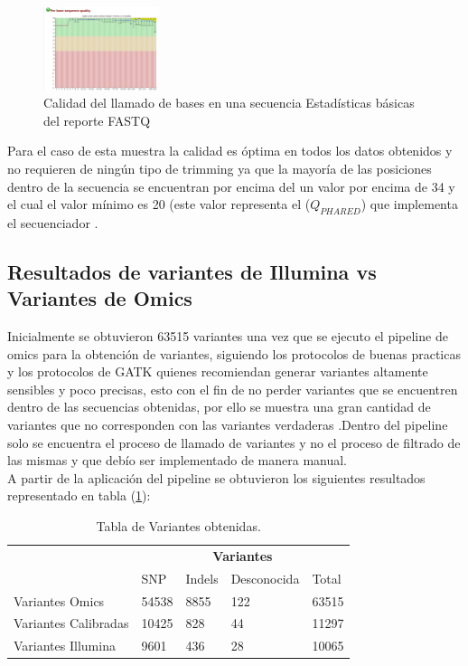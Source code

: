 \begin{figure}[h]
	\centering
	\includegraphics[width=0.3\textwidth]{Kap2/fastq2}
	\caption{Calidad del llamado de bases en una secuencia Estadísticas básicas del reporte FASTQ} \label{fig:fastq2}
\end{figure}

Para el caso de esta muestra la calidad es óptima en todos los datos obtenidos y no requieren de ningún tipo de trimming ya que la mayoría de las posiciones dentro de la secuencia se encuentran por encima del un valor por encima de 34 y el cual el valor mínimo es 20 (este valor representa el ($Q_{PHARED}$) que implementa el secuenciador \cite{Babraham2016}. 

\subsection{Resultados de variantes de Illumina vs Variantes de Omics}

Inicialmente se obtuvieron 63515 variantes una vez que se ejecuto el pipeline de omics para la obtención de variantes, siguiendo los protocolos de buenas practicas y los protocolos de GATK quienes recomiendan generar variantes altamente sensibles y poco precisas, esto con el fin de no perder variantes que se encuentren dentro de las secuencias obtenidas, por ello se muestra una gran cantidad de variantes que no corresponden con las variantes verdaderas \cite{Auwera2014}.Dentro del pipeline solo se encuentra el proceso de llamado de variantes y no el proceso de filtrado de las mismas y que debío ser implementado de manera manual.\\

A partir de la aplicación del pipeline se obtuvieron los siguientes resultados representado en tabla (\ref{tabla:final}):

\begin{table}[htb]
	\centering
	\begin{tabular}{|l|l|l|l|l|}
		\hline
		& \multicolumn{4}{c|}{\textbf{Variantes}} \\
		\cline{2-5} 
		& SNP  & Indels & Desconocida & Total \\ \cline{2-5}
		\hline 
		\multirow{1}{4cm}{Variantes Omics} & 54538 & 8855 & 122 & 63515 \\ \cline{2-5}
		\hline 
		\multirow{1}{4cm}{Variantes Calibradas} & 10425 & 828 & 44 & 11297 \\ \cline{2-5}
		\hline
		\multirow{1}{4cm}{Variantes Illumina} & 9601 & 436 & 28 & 10065 \\ \cline{2-5}
		\hline
	\end{tabular}
	\caption{Tabla de Variantes obtenidas.}
	\label{tabla:final}
\end{table}

